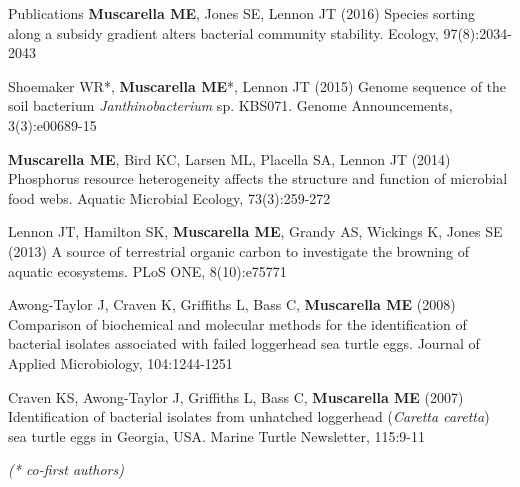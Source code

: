 \documentclass{resume} %
\begin{document}
\begin{rSection}{Publications}
{\bf Muscarella ME}, Jones SE, Lennon JT (2016) Species sorting along a
subsidy gradient alters bacterial community stability. Ecology, 97(8):2034-2043

Shoemaker WR*, {\bf Muscarella ME}*, Lennon JT (2015) Genome sequence of the
soil bacterium {\em Janthinobacterium} sp. KBS071. Genome Announcements,
3(3):e00689-15

{\bf Muscarella ME}, Bird KC, Larsen ML, Placella SA, Lennon JT (2014)
Phosphorus resource heterogeneity affects the structure and function of
microbial food webs. Aquatic Microbial Ecology, 73(3):259-272

Lennon JT, Hamilton SK, {\bf Muscarella ME}, Grandy AS, Wickings K, Jones SE
(2013) A source of terrestrial organic carbon to investigate the browning of
aquatic ecosystems. PLoS ONE, 8(10):e75771

Awong-Taylor J, Craven K, Griffiths L, Bass C, {\bf Muscarella ME} (2008)
Comparison of biochemical and molecular methods for the identification of
bacterial isolates associated with failed loggerhead sea turtle eggs. Journal of
Applied Microbiology, 104:1244-1251

Craven KS, Awong-Taylor J, Griffiths L, Bass C, {\bf Muscarella ME} (2007)
Identification of bacterial isolates from unhatched loggerhead
({\em Caretta caretta}) sea turtle eggs in Georgia, USA.
Marine Turtle Newsletter, 115:9-11

{\em (* co-first authors)}

\end{rSection}


\end{document}
